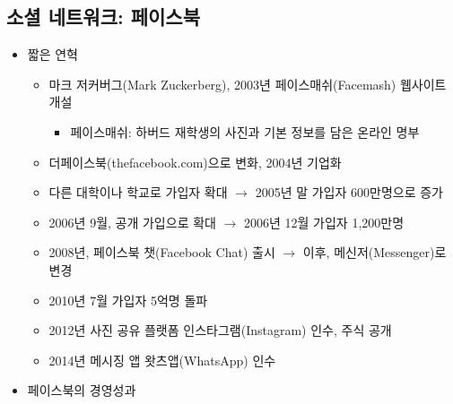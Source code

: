 \subsection{소셜 네트워크: 페이스북}
\begin{itemize}
\item 짧은 연혁
	\begin{itemize}
	\item 마크 저커버그(Mark Zuckerberg), 2003년 페이스매쉬(Facemash) 웹사이트 개설
		\begin{itemize}
		\item 페이스매쉬: 하버드 재학생의 사진과 기본 정보를 담은 온라인 명부
		\end{itemize}
	\item 더페이스북(thefacebook.com)으로 변화, 2004년 기업화
	\item 다른 대학이나 학교로 가입자 확대 $\rightarrow$ 2005년 말 가입자 600만명으로 증가
	\item 2006년 9월, 공개 가입으로 확대 $\rightarrow$ 2006년 12월 가입자 1,200만명
	\item 2008년, 페이스북 챗(Facebook Chat) 출시 $\rightarrow$ 이후, 메신저(Messenger)로 변경
	\item 2010년 7월 가입자 5억명 돌파
	\item 2012년 사진 공유 플랫폼 인스타그램(Instagram) 인수, 주식 공개
	\item 2014년 메시징 앱 왓츠앱(WhatsApp) 인수
	\end{itemize} 
\item 페이스북의 경영성과


\end{itemize}
